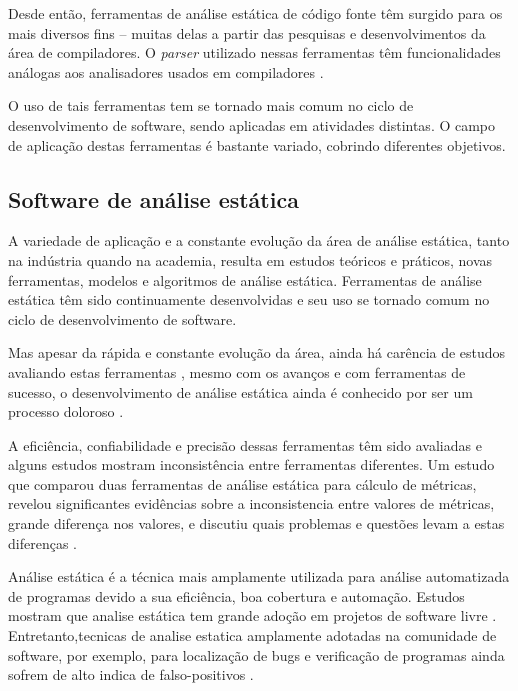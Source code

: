 Desde então, ferramentas de análise estática de código fonte têm surgido para
os mais diversos fins -- muitas delas a partir das pesquisas e
desenvolvimentos da área de compiladores.  O {\it parser} utilizado nessas
ferramentas têm funcionalidades análogas aos analisadores usados em
compiladores \cite{anderson2008the}.

O uso de tais ferramentas tem se tornado mais comum no ciclo de desenvolvimento de
software, sendo aplicadas em atividades distintas.
O campo de aplicação destas ferramentas é bastante variado, cobrindo diferentes
objetivos.

\subsection{Software de análise estática}

A variedade de aplicação e a constante evolução da área de análise estática, 
tanto na indústria quando na academia, resulta em  estudos teóricos e práticos, novas ferramentas, modelos e
algoritmos de análise estática. Ferramentas de análise estática têm sido
continuamente desenvolvidas e seu uso se tornado comum no ciclo de desenvolvimento de
software.

Mas apesar da rápida e constante evolução da área, ainda há carência de estudos
avaliando estas ferramentas \cite{li2010comparative}, mesmo com os avanços e com
ferramentas de sucesso, o desenvolvimento de análise estática ainda é conhecido
por ser um processo doloroso \cite{toman2017taming}.

A eficiência, confiabilidade e precisão dessas ferramentas têm sido avaliadas e
alguns estudos mostram inconsistência entre ferramentas diferentes.
Um estudo que comparou duas ferramentas de análise estática para cálculo de métricas,
revelou significantes evidências sobre a inconsistencia entre valores de métricas,
grande diferença nos valores, e discutiu quais problemas e questões levam a estas
diferenças \cite{alemerien2013experimental}.

Análise estática é a técnica mais amplamente utilizada para análise
automatizada de programas devido a sua eficiência, boa cobertura e automação.
Estudos mostram que analise estática tem grande adoção em projetos de software
livre \cite{beller2016analyzing}.
Entretanto,tecnicas de analise estatica amplamente adotadas na comunidade de software,
por exemplo, para localização de bugs e verificação de programas 
ainda sofrem de alto indica de falso-positivos \cite{gosain2015static}.

